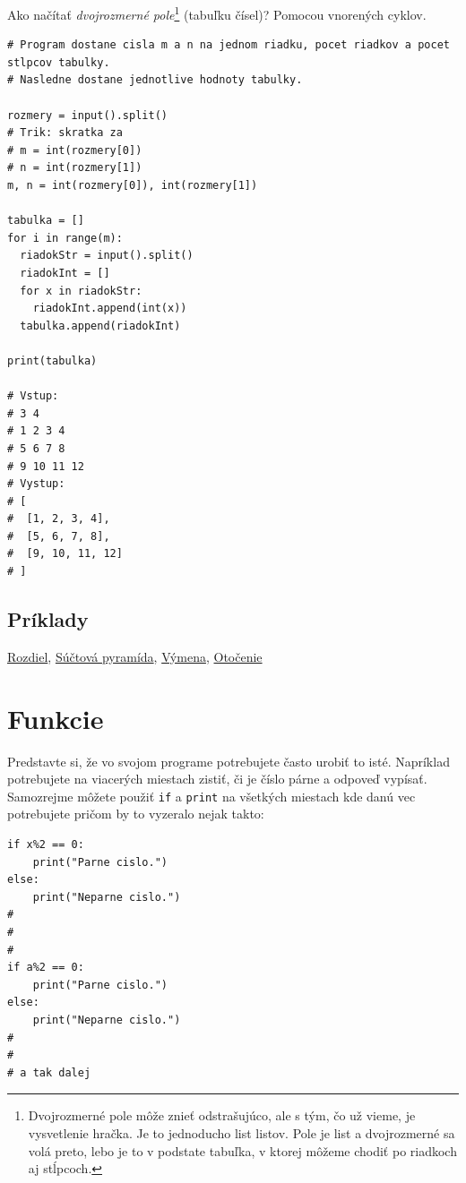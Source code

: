 Ako načítať \textit{dvojrozmerné pole}\footnote{Dvojrozmerné pole môže znieť odstrašujúco, ale s tým, čo už vieme, je vysvetlenie hračka. Je to jednoducho list listov. Pole je list a dvojrozmerné sa volá preto, lebo je to v podstate tabuľka, v ktorej môžeme chodiť po riadkoch aj stĺpcoch.} (tabuľku čísel)? Pomocou vnorených cyklov.
\begin{lstlisting}
# Program dostane cisla m a n na jednom riadku, pocet riadkov a pocet stlpcov tabulky.
# Nasledne dostane jednotlive hodnoty tabulky.

rozmery = input().split()
# Trik: skratka za
# m = int(rozmery[0])
# n = int(rozmery[1])
m, n = int(rozmery[0]), int(rozmery[1])

tabulka = []
for i in range(m):
  riadokStr = input().split()
  riadokInt = []
  for x in riadokStr:
    riadokInt.append(int(x))
  tabulka.append(riadokInt)

print(tabulka)

# Vstup:
# 3 4
# 1 2 3 4
# 5 6 7 8
# 9 10 11 12
# Vystup:
# [
#  [1, 2, 3, 4],
#  [5, 6, 7, 8],
#  [9, 10, 11, 12]
# ]
\end{lstlisting}

\subsection{Príklady}
\href{https://testovac.ksp.sk/tasks/ls-uvod-rozdiel/}{Rozdiel},
\href{https://testovac.ksp.sk/tasks/ls-uvod-suctovapyramida/}{Súčtová pyramída},
\href{https://testovac.ksp.sk/tasks/ls-uvod-vymena/}{Výmena},
\href{https://testovac.ksp.sk/tasks/ls-uvod-otocenie/}{Otočenie}

\section{Funkcie}

Predstavte si, že vo svojom programe potrebujete často urobiť to isté. Napríklad potrebujete na viacerých miestach zistiť, či je číslo párne a odpoveď vypísať. Samozrejme môžete použiť \texttt{if} a \texttt{print} na všetkých miestach kde danú vec potrebujete pričom by to vyzeralo nejak takto:

\begin{lstlisting}
if x%2 == 0:
    print("Parne cislo.")
else:
    print("Neparne cislo.")
#   
#
#
if a%2 == 0:
    print("Parne cislo.")
else:
    print("Neparne cislo.")
#
#
# a tak dalej
\end{lstlisting}


